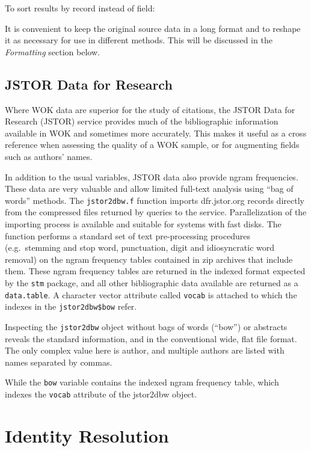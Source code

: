 To sort results by record instead of field:

It is convenient to keep the original source data in a long format and
to reshape it as necessary for use in different methods. This will be
discussed in the \emph{Formatting} section below.

\subsection{JSTOR Data for Research}\label{jstor-data-for-research}

Where WOK data are superior for the study of citations, the JSTOR Data
for Research (JSTOR) service provides much of the bibliographic
information available in WOK and sometimes more accurately. This makes
it useful as a cross reference when assessing the quality of a WOK
sample, or for augmenting fields such as authors' names.

In addition to the usual variables, JSTOR data also provide ngram
frequencies. These data are very valuable and allow limited full-text
analysis using ``bag of words'' methods. The \texttt{jstor2dbw.f}
function imports dfr.jstor.org records directly from the compressed
files returned by queries to the service. Parallelization of the
importing process is available and suitable for systems with fast disks.
The function performs a standard set of text pre-processing procedures
(e.g.~stemming and stop word, punctuation, digit and idiosyncratic word
removal) on the ngram frequency tables contained in zip archives that
include them. These ngram frequency tables are returned in the indexed
format expected by the \texttt{stm} package, and all other bibliographic
data available are returned as a \texttt{data.table}. A character vector
attribute called \texttt{vocab} is attached to which the indexes in the
\texttt{jstor2dbw\$bow} refer.

Inspecting the \texttt{jstor2dbw} object without bags of words (``bow'')
or abstracts reveals the standard information, and in the conventional
wide, flat file format. The only complex value here is author, and
multiple authors are listed with names separated by commas.

While the \texttt{bow} variable contains the indexed ngram frequency
table, which indexes the \texttt{vocab} attribute of the jstor2dbw
object.

\section{Identity Resolution}\label{identity-resolution}

